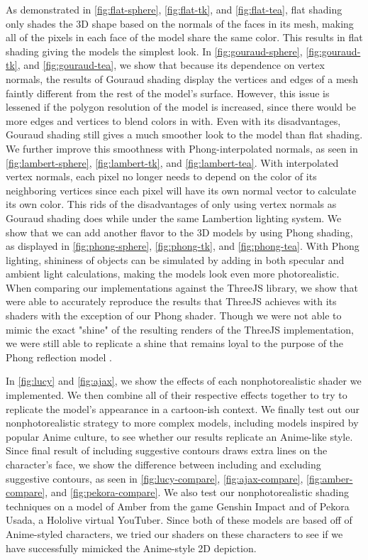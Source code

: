 \documentclass[10pt,twocolumn,letterpaper]{article}
\begin{document}
As demonstrated in \cref{fig:flat-sphere}, \cref{fig:flat-tk}, and \cref{fig:flat-tea}, flat shading only shades the 3D shape based on the normals of the faces in its mesh, making all of the pixels in each face of the model share the same color. This results in flat shading giving the models the simplest look. In \cref{fig:gouraud-sphere}, \cref{fig:gouraud-tk}, and \cref{fig:gouraud-tea}, we show that because its dependence on vertex normals, the results of Gouraud shading display the vertices and edges of a mesh faintly different from the rest of the model's surface. However, this issue is lessened if the polygon resolution of the model is increased, since there would be more edges and vertices to blend colors in with. Even with its disadvantages, Gouraud shading still gives a much smoother look to the model than flat shading. We further improve this smoothness with Phong-interpolated normals, as seen in \cref{fig:lambert-sphere}, \cref{fig:lambert-tk}, and \cref{fig:lambert-tea}. With interpolated vertex normals, each pixel no longer needs to depend on the color of its neighboring vertices since each pixel will have its own normal vector to calculate its own color. This rids of the disadvantages of only using vertex normals as Gouraud shading does while under the same Lambertion lighting system. We show that we can add another flavor to the 3D models by using Phong shading, as displayed in \cref{fig:phong-sphere}, \cref{fig:phong-tk}, and \cref{fig:phong-tea}. With Phong lighting, shininess of objects can be simulated by adding in both specular and ambient light calculations, making the models look even more photorealistic. When comparing our implementations against the ThreeJS library, we show that were able to accurately reproduce the results that ThreeJS achieves with its shaders with the exception of our Phong shader. Though we were not able to mimic the exact "shine" of the resulting renders of the ThreeJS implementation, we were still able to replicate a shine that remains loyal to the purpose of the Phong reflection model \cite{wiki:Phong_shading}.

In \cref{fig:lucy} and \cref{fig:ajax}, we show the effects of each nonphotorealistic shader we implemented. We then combine all of their respective effects together to try to replicate the model's appearance in a cartoon-ish context. We finally test out our nonphotorealistic strategy to more complex models, including models inspired by popular Anime culture, to see whether our results replicate an Anime-like style. Since final result of including suggestive contours draws extra lines on the character's face, we show the difference between including and excluding suggestive contours, as seen in \cref{fig:lucy-compare}, \cref{fig:ajax-compare}, \cref{fig:amber-compare}, and \cref{fig:pekora-compare}. We also test our nonphotorealistic shading techniques on a model of Amber from the game Genshin Impact and of Pekora Usada, a Hololive virtual YouTuber. Since both of these models are based off of Anime-styled characters, we tried our shaders on these characters to see if we have successfully mimicked the Anime-style 2D depiction.
\end{document}
